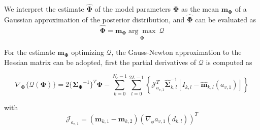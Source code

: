 We interpret the estimate $\hat{\mathbf{\Phi}}$ of the model
parameters $\mathbf{\Phi}$ as  the mean $\mathbf{m}_{\mathbf{\Phi}}$ of a Gaussian
approximation of the posterior distribution, and $\hat{\mathbf{\Phi}}$ can be evaluated as 
\begin{equation}
  \label{eq:maxcost}
  \hat{\mathbf{\Phi}} = \mathbf{m}_{\mathbf{\Phi}}\underset{\mathbf{\Phi}}{\arg\max} \ \mathcal{Q}
\end{equation}

For the estimate $\mathbf{m}_{\mathbf{\Phi}}$ optimizing
$\mathcal{Q}$, the Gauss-Newton approximation to
the Hessian matrix can be adopted, first the partial derivatives of
$\mathcal{Q}$ is computed as 

\begin{equation}
\label{eq:partcost}
\nabla_{\mathbf{\Phi}}\{{\mathcal{Q}(\mathbf{\Phi})}\} =  2\{{\mathbf{\Sigma}_{\mathbf{\Phi}}}^{-1}\}^{T}{\mathbf{\Phi}} - \sum_{k = 0}^{N_{c}-1} \sum_{l=0}^{2L-1}
\left\{\mathcal{J}_{a_{v,1}}^T\hat{\mathbf{\Sigma}}_{k,l}^{-1}\left[I_{k,l}-\hat{\mathbf{m}}_{k,l}(a_{v,1})\right]\right\}
\end{equation}

with 
\begin{equation}
  \label{eq:jocob}
  \mathcal{J}_{a_{v,1}} = \left( \mathbf{m}_{k,1} -\mathbf{m}_{k,2} \right)(\nabla_{\phi} a_{v,1}(d_{k,l}))^T
\end{equation}

